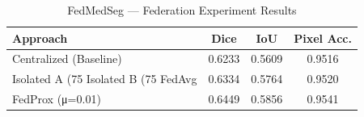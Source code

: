 \begin{table}[h]
\centering
\caption{FedMedSeg — Federation Experiment Results}
\label{tab:federation_results}
\begin{tabular}{l c c c}
\hline
\textbf{Approach} & \textbf{Dice} & \textbf{IoU} & \textbf{Pixel Acc.} \\
\hline
  Centralized (Baseline) & 0.6233 & 0.5609 & 0.9516 \\
  Isolated A (75%
  Isolated B (75%
  FedAvg & 0.6334 & 0.5764 & 0.9520 \\
  FedProx (μ=0.01) & 0.6449 & 0.5856 & 0.9541 \\
\hline
\end{tabular}
\end{table}